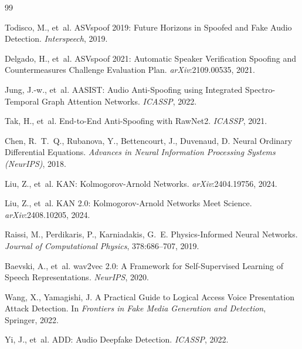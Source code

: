 \documentclass{article}
\begin{document}
\begin{thebibliography}{99}
\small

Todisco, M., et~al.
\newblock ASVspoof 2019: Future Horizons in Spoofed and Fake Audio Detection.
\newblock \textit{Interspeech}, 2019.

Delgado, H., et~al.
\newblock ASVspoof 2021: Automatic Speaker Verification Spoofing and
  Countermeasures Challenge Evaluation Plan.
\newblock \textit{arXiv}:2109.00535, 2021.

Jung, J.-w., et~al.
\newblock AASIST: Audio Anti-Spoofing using Integrated Spectro-Temporal Graph
  Attention Networks.
\newblock \textit{ICASSP}, 2022.

Tak, H., et~al.
\newblock End-to-End Anti-Spoofing with RawNet2.
\newblock \textit{ICASSP}, 2021.

Chen, R.~T.~Q., Rubanova, Y., Bettencourt, J., Duvenaud, D.
\newblock Neural Ordinary Differential Equations.
\newblock \textit{Advances in Neural Information Processing Systems (NeurIPS)}, 2018.

Liu, Z., et~al.
\newblock KAN: Kolmogorov-Arnold Networks.
\newblock \textit{arXiv}:2404.19756, 2024.

Liu, Z., et~al.
\newblock KAN 2.0: Kolmogorov-Arnold Networks Meet Science.
\newblock \textit{arXiv}:2408.10205, 2024.

Raissi, M., Perdikaris, P., Karniadakis, G.~E.
\newblock Physics-Informed Neural Networks.
\newblock \textit{Journal of Computational Physics}, 378:686--707, 2019.

Baevski, A., et~al.
\newblock wav2vec 2.0: A Framework for Self-Supervised Learning of Speech
  Representations.
\newblock \textit{NeurIPS}, 2020.

Wang, X., Yamagishi, J.
\newblock A Practical Guide to Logical Access Voice Presentation Attack
  Detection.
\newblock In \textit{Frontiers in Fake Media Generation and Detection},
  Springer, 2022.

Yi, J., et~al.
\newblock ADD: Audio Deepfake Detection.
\newblock \textit{ICASSP}, 2022.


\end{thebibliography}
\end{document}
